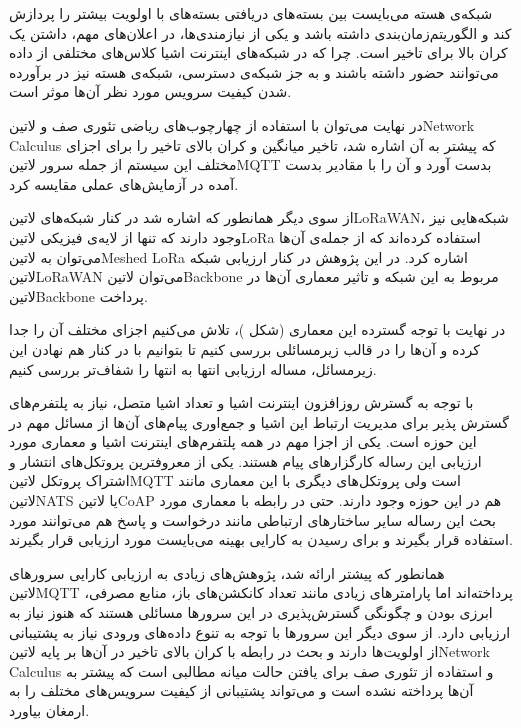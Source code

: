 شبکه‌ی هسته می‌بایست بین بسته‌های دریافتی بسته‌های با اولویت بیشتر را پردازش کند و الگوریتم‌زمان‌بندی داشته باشد و یکی از نیازمندی‌ها، در اعلان‌های مهم، داشتن یک کران بالا برای تاخیر است.
چرا که در شبکه‌های اینترنت اشیا کلاس‌های مختلفی از داده می‌توانند حضور داشته باشند و به جز شبکه‌ی دسترسی، شبکه‌ی هسته نیز در برآورده شدن کیفیت سرویس مورد نظر آن‌ها موثر است.

در نهایت می‌توان با استفاده از چهارچوب‌های ریاضی تئوری صف و ‌لاتین{Network Calculus} که پیشتر به آن اشاره شد،
تاخیر میانگین و کران بالای تاخیر را برای اجزای مختلف این سیستم از جمله
سرور ‌لاتین{MQTT} بدست آورد و آن را با مقادیر بدست آمده در آزمایش‌های عملی
مقایسه کرد.

از سوی دیگر همانطور که اشاره شد در کنار شبکه‌های ‌لاتین{LoRaWAN}، شبکه‌هایی نیز وجود دارند
که تنها از لایه‌ی فیزیکی ‌لاتین{LoRa} استفاده کرده‌اند که از جمله‌ی آن‌ها می‌توان به ‌لاتین{Meshed LoRa}
اشاره کرد. در این پژوهش در کنار ارزیابی شبکه ‌لاتین{LoRaWAN} می‌توان ‌لاتین{Backbone} مربوط
به این شبکه و تاثیر معماری آن‌ها در ‌لاتین{Backbone} پرداخت.

در نهایت با توجه گسترده این معماری (شکل )،
تلاش می‌کنیم اجزای مختلف آن را جدا کرده و آن‌ها را در قالب زیرمسائلی بررسی کنیم تا بتوانیم
با در کنار هم نهادن این زیرمسائل، مساله ارزیابی انتها به انتها را شفاف‌تر بررسی کنیم.


با توجه به گسترش روزافزون اینترنت اشیا و تعداد اشیا متصل، نیاز به پلتفرم‌های گسترش پذیر برای مدیریت ارتباط این اشیا و جمع‌اوری پیام‌های آن‌ها
از مسائل مهم در این حوزه است. یکی از اجزا مهم در همه پلتفرم‌های اینترنت اشیا و معماری مورد ارزیابی این رساله کارگزار‌های پیام هستند. یکی از
معروفترین پروتکل‌های انتشار و اشتراک پروتکل ‌لاتین{MQTT} است ولی پروتکل‌های دیگری با این معماری مانند ‌لاتین{NATS} یا
‌لاتین{CoAP} هم در این حوزه وجود دارند. حتی در رابطه با معماری مورد بحث این رساله سایر ساختارهای ارتباطی مانند درخواست و پاسخ
هم می‌توانند مورد استفاده قرار بگیرند و برای رسیدن به کارایی بهینه می‌بایست مورد ارزیابی قرار بگیرند.

همانطور که پیشتر ارائه شد، پژوهش‌های زیادی به ارزیابی کارایی سرورهای ‌لاتین{MQTT} پرداخته‌اند اما پارامترهای زیادی مانند تعداد کانکشن‌های باز،
منابع مصرفی، ابرزی بودن و چگونگی گسترش‌پذیری در این سرورها مسائلی هستند که هنوز نیاز به ارزیابی دارد.
از سوی دیگر این سرورها با توجه به تنوع داده‌های ورودی نیاز به پشتیبانی
از اولویت‌ها دارند و بحث در رابطه با کران بالای تاخیر در آن‌ها بر پایه ‌لاتین{Network Calculus}
و استفاده از تئوری صف برای یافتن حالت میانه مطالبی است که پیشتر به آن‌ها پرداخته نشده است و می‌تواند پشتیبانی
از کیفیت سرویس‌های مختلف را به ارمغان بیاورد.

